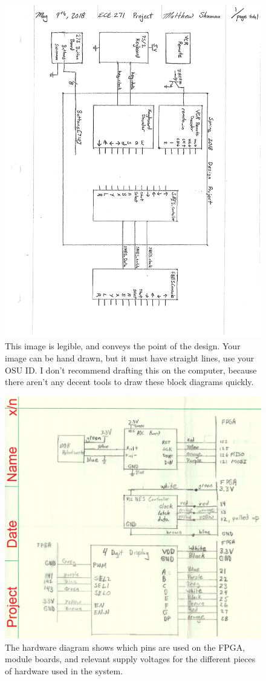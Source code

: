 \documentclass[a4paper]{article}
\begin{document}
\begin{figure}[h]
  \centering
  \includegraphics[width=.8\textwidth]{images/description.png}
	\caption{This image is legible, and conveys the point of the design.  Your image can be hand drawn, but it must have straight lines, use your OSU ID.  I don't recommend drafting this on the computer, because there aren't any decent tools to draw these block diagrams quickly.}
  \label{fig:description}
\end{figure}

\begin{figure}[h]
  \centering
    \includegraphics[width=.8\textwidth]{images/hardware.png}
	\caption{The hardware diagram shows which pins are used on the FPGA, module boards, and relevant supply voltages for the different pieces of hardware used in the system.}
    \label{fig:hardware}
\end{figure}
\end{document}
